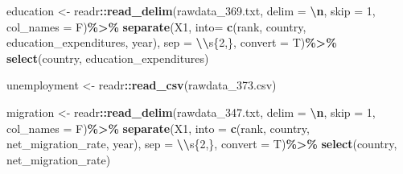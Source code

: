 \documentclass[
]{article}
\newenvironment{Shaded}{\begin{snugshade}}{\end{snugshade}}
\newcommand{\AttributeTok}[1]{\textcolor[rgb]{0.13,0.29,0.53}{#1}}
\newcommand{\DecValTok}[1]{\textcolor[rgb]{0.00,0.00,0.81}{#1}}
\newcommand{\FunctionTok}[1]{\textcolor[rgb]{0.13,0.29,0.53}{\textbf{#1}}}
\newcommand{\NormalTok}[1]{#1}
\newcommand{\OtherTok}[1]{\textcolor[rgb]{0.56,0.35,0.01}{#1}}
\newcommand{\SpecialCharTok}[1]{\textcolor[rgb]{0.81,0.36,0.00}{\textbf{#1}}}
\newcommand{\StringTok}[1]{\textcolor[rgb]{0.31,0.60,0.02}{#1}}
\begin{document}
\begin{Shaded}
\begin{Highlighting}[]
\NormalTok{education }\OtherTok{\textless{}{-}}\NormalTok{ readr}\SpecialCharTok{::}\FunctionTok{read\_delim}\NormalTok{(}\StringTok{\textquotesingle{}rawdata\_369.txt\textquotesingle{}}\NormalTok{, }\AttributeTok{delim =} \StringTok{\textquotesingle{}}\SpecialCharTok{\textbackslash{}n}\StringTok{\textquotesingle{}}\NormalTok{, }\AttributeTok{skip =} \DecValTok{1}\NormalTok{, }\AttributeTok{col\_names =}\NormalTok{ F)}\SpecialCharTok{\%\textgreater{}\%}
\FunctionTok{separate}\NormalTok{(X1, }\AttributeTok{into=} \FunctionTok{c}\NormalTok{(}\StringTok{\textquotesingle{}rank\textquotesingle{}}\NormalTok{, }\StringTok{\textquotesingle{}country\textquotesingle{}}\NormalTok{, }\StringTok{\textquotesingle{}education\_expenditures\textquotesingle{}}\NormalTok{, }\StringTok{\textquotesingle{}year\textquotesingle{}}\NormalTok{), }\AttributeTok{sep =} \StringTok{\textquotesingle{}}\SpecialCharTok{\textbackslash{}\textbackslash{}}\StringTok{s\{2,\}\textquotesingle{}}\NormalTok{, }\AttributeTok{convert =}\NormalTok{ T)}\SpecialCharTok{\%\textgreater{}\%}
\FunctionTok{select}\NormalTok{(country, education\_expenditures)}

\NormalTok{unemployment }\OtherTok{\textless{}{-}}\NormalTok{ readr}\SpecialCharTok{::}\FunctionTok{read\_csv}\NormalTok{(}\StringTok{\textquotesingle{}rawdata\_373.csv\textquotesingle{}}\NormalTok{)}

\NormalTok{migration }\OtherTok{\textless{}{-}}\NormalTok{ readr}\SpecialCharTok{::}\FunctionTok{read\_delim}\NormalTok{(}\StringTok{\textquotesingle{}rawdata\_347.txt\textquotesingle{}}\NormalTok{, }\AttributeTok{delim =} \StringTok{\textquotesingle{}}\SpecialCharTok{\textbackslash{}n}\StringTok{\textquotesingle{}}\NormalTok{, }\AttributeTok{skip =} \DecValTok{1}\NormalTok{, }\AttributeTok{col\_names =}\NormalTok{ F)}\SpecialCharTok{\%\textgreater{}\%}
\FunctionTok{separate}\NormalTok{(X1, }\AttributeTok{into =} \FunctionTok{c}\NormalTok{(}\StringTok{\textquotesingle{}rank\textquotesingle{}}\NormalTok{, }\StringTok{\textquotesingle{}country\textquotesingle{}}\NormalTok{, }\StringTok{\textquotesingle{}net\_migration\_rate\textquotesingle{}}\NormalTok{, }\StringTok{\textquotesingle{}year\textquotesingle{}}\NormalTok{), }\AttributeTok{sep =} \StringTok{\textquotesingle{}}\SpecialCharTok{\textbackslash{}\textbackslash{}}\StringTok{s\{2,\}\textquotesingle{}}\NormalTok{, }\AttributeTok{convert =}\NormalTok{ T)}\SpecialCharTok{\%\textgreater{}\%}
\FunctionTok{select}\NormalTok{(country, net\_migration\_rate)}
\end{Highlighting}
\end{Shaded}
\end{document}
